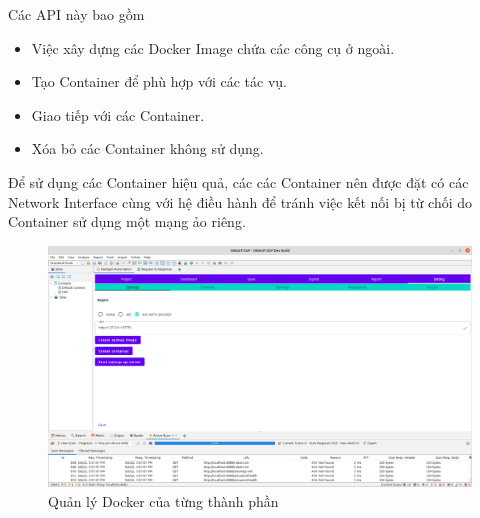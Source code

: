 \documentclass[./../main.tex]{subfiles}
\begin{document}
Các API này bao gồm
\begin{itemize}
	\item Việc xây dựng các Docker Image chứa các công cụ ở ngoài.
	\item Tạo Container để phù hợp với các tác vụ.
	\item Giao tiếp với các Container.
	\item Xóa bỏ các Container không sử dụng.
\end{itemize}

Để sử dụng các Container hiệu quả, các các Container nên được đặt
có các Network Interface cùng với hệ điều hành để tránh việc kết nối
bị từ chối do Container sử dụng một mạng ảo riêng.

\begin{figure}[h!]
	\includegraphics[width=\linewidth]{./images/docker.png}
	\caption{Quản lý Docker của từng thành phần}
	\label{fig:docker}
\end{figure}
\end{document}
